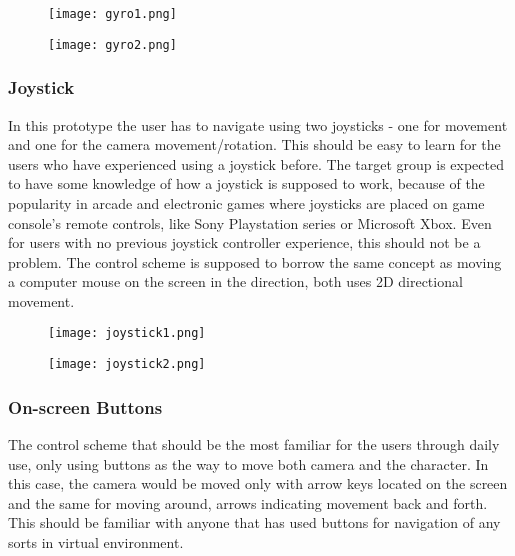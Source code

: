 \begin{figure}[H]
\centering
\begin{minipage}{.5\textwidth}
  \centering
  \texttt{[image: gyro1.png]}
  \label{fig:test1}
\end{minipage}%
\begin{minipage}{.5\textwidth}
  \centering
  \texttt{[image: gyro2.png]}
  \label{fig:test2}
\end{minipage}
\end{figure}


\subsubsection{Joystick}
In this prototype the user has to navigate using two joysticks - one for movement and one for the camera movement/rotation. This should be easy to learn for the users who have experienced using a joystick before. The target group is expected to have some knowledge of how a joystick is supposed to work, because of the popularity in arcade and electronic games where joysticks are placed on game console's remote controls, like Sony Playstation series or Microsoft Xbox. Even for users with no previous joystick controller experience, this should not be a problem. The control scheme is supposed to borrow the same concept as moving a computer mouse on the screen in the direction, both uses 2D directional movement.

\begin{figure}[H]
\centering
\begin{minipage}{.5\textwidth}
  \centering
  \texttt{[image: joystick1.png]}
\end{minipage}%
\begin{minipage}{.5\textwidth}
  \centering
  \texttt{[image: joystick2.png]}
\end{minipage}
\end{figure}

\subsubsection{On-screen Buttons}
The control scheme that should be the most familiar for the users through daily use, only using buttons as the way to move both camera and the character. In this case, the camera would be moved only with arrow keys located on the screen and the same for moving around, arrows indicating movement back and forth. This should be familiar with anyone that has used buttons for navigation of any sorts in virtual environment. 

